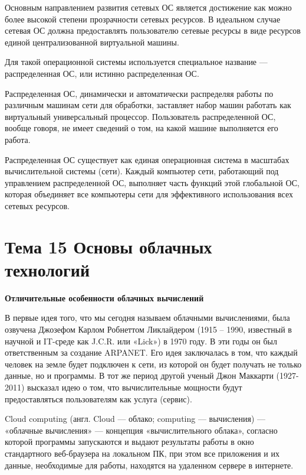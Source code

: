 Основным направлением развития сетевых ОС является достижение как можно более высокой степени прозрачности сетевых ресурсов. В идеальном случае сетевая ОС должна предоставлять пользователю сетевые ресурсы в виде ресурсов единой централизованной виртуальной машины.

\begin{opr}
  Для такой операционной системы используется специальное название — распределенная ОС, или истинно распределенная ОС.
\end{opr}

Распределенная ОС, динамически и автоматически распределяя работы по различным машинам сети для обработки, заставляет набор машин работать как виртуальный универсальный процессор. Пользователь распределенной ОС, вообще говоря, не имеет сведений о том, на какой машине выполняется его работа.

Распределенная ОС существует как единая операционная система в масштабах вычислительной системы (сети). Каждый компьютер сети, работающий под управлением распределенной ОС, выполняет часть функций этой глобальной ОС, которая объединя­ет все компьютеры сети для эффективного использования всех сетевых ресурсов.

\newpage 
\chapter{Тема 15 Основы облачных технологий}

\begin{center}{\bfseries Отличительные особенности облачных вычислений}
\end{center}

В первые идея того, что мы сегодня называем облачными вычислениями, была озвучена Джозефом Карлом Робнеттом Ликлайдером (1915 – 1990, известный в научной и IT-среде как J.C.R. или «Lick») в 1970 году. В эти годы он был ответственным за создание ARPANET. Его идея заключалась в том, что каждый человек на земле будет подключен к сети, из которой он будет получать не только данные, но и программы. В тот же период другой ученый Джон Маккарти (1927-2011) высказал идею о том, что вычислительные мощности будут предоставляться пользователям как услуга (сервис).

\begin{opr}
  Cloud computing (англ. Cloud — облако; computing — вычисления) — «облачные вычисления» — концепция «вычислительного облака», согласно которой программы запускаются и выдают результаты работы в окно стандартного веб-браузера на локальном ПК, при этом все приложения и их данные, необходимые для работы, находятся на удаленном сервере в интернете.
\end{opr}


